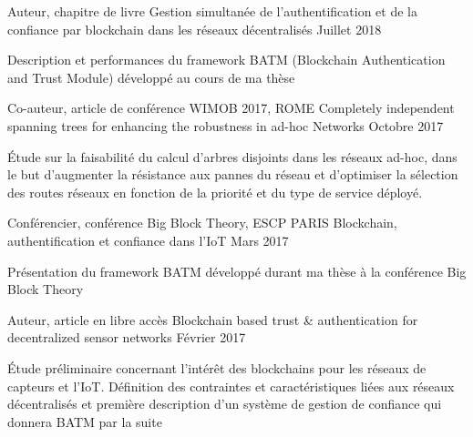 

\begin{cventries}

  \cventry
    {Auteur, chapitre de livre} %
    {Gestion simultanée de l’authentification et de la confiance par blockchain dans les réseaux décentralisés} %
    {} %
    {Juillet 2018} %
    {
      \begin{cvitems} %
        \item {Description et performances du framework BATM (Blockchain Authentication and Trust Module) développé au cours de ma thèse}
      \end{cvitems}
    }

  \cventry
    {Co-auteur, article de conférence WIMOB 2017, ROME} %
    {Completely independent spanning trees for enhancing the robustness in ad-hoc Networks} %
    {} %
    {Octobre 2017} %
    {
      \begin{cvitems} %
        \item {\'Etude sur la faisabilité du calcul d'arbres disjoints dans les réseaux ad-hoc, dans le but d'augmenter la résistance aux pannes du réseau et d'optimiser la sélection des routes réseaux en fonction de la priorité et du type de service déployé.}
      \end{cvitems}
    }

  \cventry
    {Conférencier, conférence Big Block Theory, ESCP PARIS} %
    {Blockchain, authentification et confiance dans l'IoT}
    {} %
    {Mars 2017} %
    {
      \begin{cvitems} %
      \item {Présentation du framework BATM développé durant ma thèse à la conférence Big Block Theory}
      \end{cvitems}
    }

  \cventry
    {Auteur, article en libre accès} %
    {Blockchain based trust \& authentication for decentralized sensor networks} %
    {} %
    {Février 2017} %
    {
      \begin{cvitems} %
        \item {\'Etude préliminaire concernant l'intérêt des blockchains pour les réseaux de capteurs et l'IoT. Définition des contraintes et caractéristiques liées aux réseaux décentralisés et première description d'un système de gestion de confiance qui donnera BATM par la suite}
      \end{cvitems}
    }


\end{cventries}
